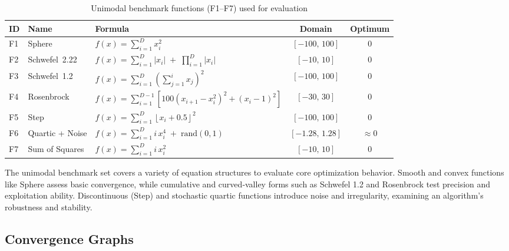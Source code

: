 \documentclass[12pt,a4paper]{article}
\begin{document}
\begin{table}[h!]
\centering
\small
\setlength{\tabcolsep}{6pt}
\begin{tabular}{llp{5.2cm}cc}
\toprule
\textbf{ID} & \textbf{Name} & \textbf{Formula} & \textbf{Domain} & \textbf{Optimum} \\
\midrule

F1 & Sphere 
& $f(x)=\displaystyle\sum_{i=1}^{D} x_i^{2}$ 
& $[-100,\,100]$ 
& $0$ \\

F2 & Schwefel~2.22 
& $f(x)=\displaystyle\sum_{i=1}^{D} |x_i| \;+\; \prod_{i=1}^{D} |x_i|$ 
& $[-10,\,10]$ 
& $0$ \\

F3 & Schwefel~1.2 
& $f(x)=\displaystyle\sum_{i=1}^{D}\left(\sum_{j=1}^{i} x_j\right)^{2}$ 
& $[-100,\,100]$ 
& $0$ \\

F4 & Rosenbrock 
& $f(x)=\displaystyle\sum_{i=1}^{D-1}\left[100(x_{i+1}-x_i^{2})^{2}+(x_i-1)^{2}\right]$ 
& $[-30,\,30]$ 
& $0$ \\

F5 & Step 
& $f(x)=\displaystyle\sum_{i=1}^{D} \left\lfloor x_i+0.5 \right\rfloor^{2}$ 
& $[-100,\,100]$ 
& $0$ \\

F6 & Quartic + Noise 
& $f(x)=\displaystyle\sum_{i=1}^{D} i\,x_i^{4} \;+\; \text{rand}(0,1)$ 
& $[-1.28,\,1.28]$ 
& $\approx 0$ \\

F7 & Sum of Squares 
& $f(x)=\displaystyle\sum_{i=1}^{D} i\,x_i^{2}$ 
& $[-10,\,10]$ 
& $0$ \\

\bottomrule
\end{tabular}
\caption{Unimodal benchmark functions (F1–F7) used for evaluation}
\label{tab:unimodal}
\end{table}

The unimodal benchmark set covers a variety of equation structures to evaluate core optimization behavior. Smooth and convex functions like Sphere assess basic convergence, while cumulative and curved‐valley forms such as Schwefel 1.2 and Rosenbrock test precision and exploitation ability. Discontinuous (Step) and stochastic quartic functions introduce noise and irregularity, examining an algorithm’s robustness and stability.




\subsection{Convergence Graphs}
\end{document}
